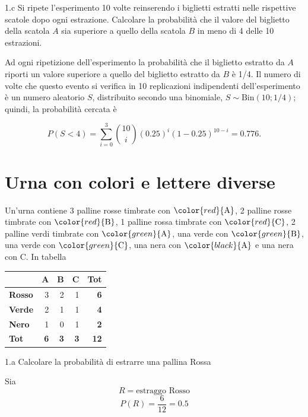 \documentclass[
  11pt,
]{book}
\theoremstyle{mytheoremstyle}
\theoremstyle{mydefstyle}
\newenvironment{sol}
  {
  \begin{tcolorbox}[enhanced,breakable,arc=0.1mm,boxrule=1pt,colback=white,colframe=iblue,
  title=\bf \fontfamily{lmss}\selectfont \hspace{.5 cm} Soluzione,drop fuzzy shadow]

}{
\end{tcolorbox}
  }
\begin{document}
1.c Si ripete l'esperimento 10 volte reinserendo i biglietti
estratti nelle rispettive scatole dopo ogni estrazione.
Calcolare la probabilità che il valore del biglietto della
scatola \(A\) sia superiore a quello della scatola \(B\) in meno
di 4 delle 10 estrazioni.

\begin{sol}
Ad ogni ripetizione dell'esperimento la probabilità che
il biglietto estratto da \(A\) riporti un valore superiore
a quello del biglietto estratto da \(B\) è 1/4.
Il numero di volte che questo evento si verifica in 10
replicazioni indipendenti dell'esperimento è un numero
aleatorio \(S\), distribuito secondo una binomiale,
\(S\sim \mbox{Bin}(10;  1/4)\); quindi, la probabilità
cercata è

\[
P(S<4)
= \sum_{i=0}^{3} \binom{10}{i} (0.25)^{i} (1-0.25)^{10-i}
= 0.776  .
\]

\end{sol}

\section{Urna con colori e lettere diverse}\label{urna-con-colori-e-lettere-diverse}

Un'urna contiene 3 palline rosse timbrate con \(\color{red}{\mbox{A}}\), 2 palline rosse timbrate con \(\color{red}{\mbox{B}}\), 1 palline rossa timbrate con \(\color{red}{\mbox{C}}\), 2 palline verdi timbrate con \(\color{green}{\mbox{A}}\), una verde con \(\color{green}{\mbox{B}}\), una verde con \(\color{green}{\mbox{C}}\), una nera con \(\color{black}{\mbox{A}}\) e una nera con \(\mbox{C}\).
In tabella

\begin{tabular}{>{}l|rrr|>{}r}
\toprule
 & A & B & C & Tot\\
\midrule
\textbf{Rosso} & 3 & 2 & 1 & \textbf{6}\\
\textbf{Verde} & 2 & 1 & 1 & \textbf{4}\\
\textbf{Nero} & 1 & 0 & 1 & \textbf{2}\\
\midrule
\textbf{\textbf{Tot}} & \textbf{6} & \textbf{3} & \textbf{3} & \textbf{\textbf{12}}\\
\bottomrule
\end{tabular}

1.a Calcolare la probabilità di estrarre una pallina Rossa

\begin{sol}
Sia
\[
R = \text{estraggo Rosso}
\]
\[
P(R)=\frac6{12}=0.5
\]

\end{sol}
\end{document}
